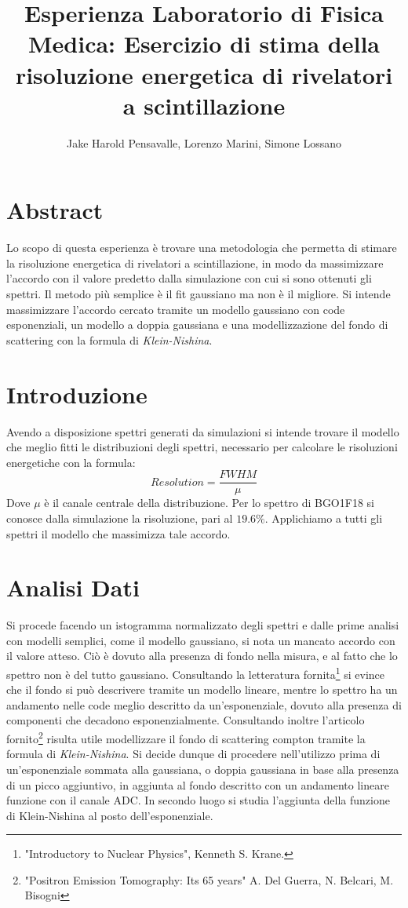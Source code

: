 \documentclass[a4paper]{article}
\title{Esperienza Laboratorio di Fisica Medica: Esercizio di stima della risoluzione energetica di rivelatori a scintillazione}
\author{Jake Harold Pensavalle, Lorenzo Marini, Simone Lossano}
\begin{document}
	\maketitle
	\newpage
	\tableofcontents
	\newpage
\section{Abstract}
Lo scopo di questa esperienza è trovare una metodologia che permetta di stimare la risoluzione energetica di rivelatori a scintillazione, in modo da massimizzare l'accordo con il valore predetto dalla simulazione con cui si sono ottenuti gli spettri. Il metodo più semplice è il fit gaussiano ma non è il migliore. Si intende massimizzare l'accordo cercato tramite un modello gaussiano con code esponenziali, un modello a doppia gaussiana e una modellizzazione del fondo di scattering con la formula di \textit{Klein-Nishina}.
\section{Introduzione}
Avendo a disposizione spettri generati da simulazioni si intende trovare il modello che meglio fitti le distribuzioni degli spettri, necessario per calcolare le risoluzioni energetiche con la formula:
\begin{equation}
Resolution=\frac{FWHM}{\mu}
\end{equation}
Dove $\mu$ è il canale centrale della distribuzione. Per lo spettro di BGO1F18 si conosce dalla simulazione la risoluzione, pari al $19.6\%$. Applichiamo a tutti gli spettri il modello che massimizza tale accordo.
\section{Analisi Dati}
Si procede facendo un istogramma normalizzato degli spettri e dalle prime analisi con modelli semplici, come il modello gaussiano, si nota un mancato accordo con il valore atteso. Ciò è dovuto alla presenza di fondo nella misura, e al fatto che lo spettro non è del tutto gaussiano. Consultando la letteratura fornita\footnote{\label{note1}"Introductory to Nuclear Physics", Kenneth S. Krane.} si evince che il fondo si può descrivere tramite un modello lineare, mentre lo spettro ha un andamento nelle code meglio descritto da un'esponenziale, dovuto alla presenza di componenti che decadono esponenzialmente. Consultando inoltre l'articolo fornito\footnote{\label{note2}"Positron Emission Tomography: Its 65 years"
A. Del Guerra, N. Belcari, M. Bisogni} risulta utile modellizzare il fondo di scattering compton tramite la formula di \textit{Klein-Nishina}.
Si decide dunque di procedere nell'utilizzo prima di un'esponenziale sommata alla gaussiana, o doppia gaussiana in base alla presenza di un picco aggiuntivo, in aggiunta al fondo descritto con un andamento lineare funzione con il canale ADC. In secondo luogo si studia l'aggiunta della funzione di Klein-Nishina al posto dell'esponenziale.
\end{document}
